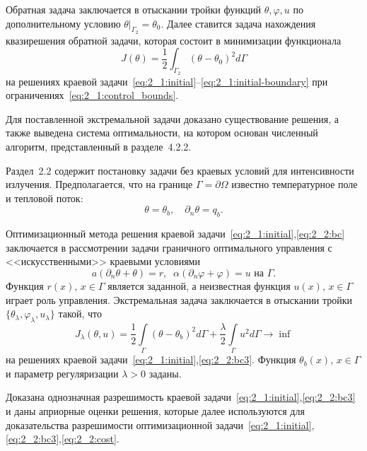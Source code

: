 Обратная задача заключается в отыскании тройки функций $\theta, \varphi, u$
по дополнительному условию $\theta|_{\Gamma_2} = \theta_0$.
Далее ставится задача нахождения квазирешения обратной задачи,
которая состоит в минимизации функционала
\begin{equation}
    \label{eq:2_1:quality}
    J(\theta) = \frac{1}{2} \int_{\Gamma_2} (\theta - \theta_0)^2 d\Gamma
\end{equation}
на решениях краевой задачи~\eqref{eq:2_1:initial}--\eqref{eq:2_1:initial-boundary}
при ограничениях~\eqref{eq:2_1:control_bounds}.

Для поставленной экстремальной задачи доказано существование решения,
а также выведена система оптимальности, на котором
основан численный алгоритм, представленный в разделе~4.2.2.


Раздел~2.2 содержит постановку задачи без краевых условий для интенсивности излучения.
Предполагается, что на границе $\Gamma = \partial \Omega$ известно температурное поле и тепловой поток:
\begin{equation}
    \label{eq:2_2:bc} \theta = \theta_b, \quad \partial_n\theta = q_b.
\end{equation}

Оптимизационный метода решения краевой задачи~\eqref{eq:2_1:initial},\eqref{eq:2_2:bc}
заключается в рассмотрении задачи граничного
оптимального управления с <<искусственными>> краевыми условиями
\begin{equation}
    \label{eq:2_2:bc3}
    a(\partial_n\theta+\theta) = r,\;\;
    \alpha(\partial_n\varphi+\varphi) = u \text{ на }\Gamma.
\end{equation}
Функция $r(x),\, x\in\Gamma$ является заданной, а неизвестная функция $u(x),\, x\in\Gamma$
играет роль управления.
Экстремальная задача заключается в отыскании тройки
$\{\theta_\lambda,\varphi_\lambda,u_\lambda\}$ такой, что
\begin{equation}
    \label{eq:2_2:cost}
    J_\lambda(\theta, u) = \frac{1}{2}\int\limits_\Gamma (\theta - \theta_b)^2 d\Gamma
    + \frac{\lambda}{2}\int\limits_\Gamma u^2 d\Gamma \rightarrow\inf
\end{equation}
на решениях краевой задачи~\eqref{eq:2_1:initial},\eqref{eq:2_2:bc3}.
Функция $\theta_b(x),\, x\in\Gamma$  и параметр регуляризации $\lambda>0$ заданы.


Доказана однозначная разрешимость краевой задачи~\eqref{eq:2_1:initial},\eqref{eq:2_2:bc3}
и даны априорные оценки решения, которые далее используются для доказательства разрешимости
оптимизационной задачи~\eqref{eq:2_1:initial},\eqref{eq:2_2:bc3},\eqref{eq:2_2:cost}.


